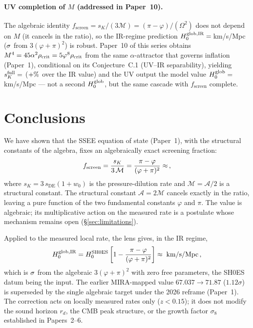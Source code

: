 \documentclass[12pt,a4paper]{article}
\newcommand{\phiG}{\varphi}
\newcommand{\MIRA}{\mathcal{M}}
\newcommand{\AURA}{\mathcal{A}}
\newcommand{\fsc}{f_{\mathrm{screen}}}
\newcommand{\sK}{s_K}          %
\newcommand{\sDE}{s_{\mathrm{DE}}} %
\renewcommand{\Omega}{\varOmega}
\begin{document}
\paragraph{UV completion of $M$ (addressed in Paper~10).}
The algebraic identity $\fsc = \sK/(3\MIRA) = (\pi-\phiG)/(\Omega^2)$ does not
depend on $M$ (it cancels in the ratio), so the IR-regime prediction
$H_0^{\rm glob,IR} = \val{p9_sh0es_glob_IR}$\,km/s/Mpc ($\val{p9_sh0es_sig_IR}\sigma$ from $3(\phiG+\pi)^2$) is robust.
Paper~10 of this series \citep{Paper10} obtains $M^4 = 45\alpha^2\rho_{\rm crit} = 5\phiG^8\rho_{\rm crit}$
from the same $\alpha$-attractor that governs inflation (Paper~1), conditional on its
Conjecture~C.1 (UV--IR separability), yielding
$\sK^{\rm full} = \val{S_K_FULL_d5}$ ($+\val{sK_UV_pct}\%$ over the IR value) and the UV output
the model value $H_0^{\rm glob} = \val{H0_GLOBAL_d5}$\,km/s/Mpc --- not a second
$H_0^{\rm glob}$, but the same cascade with $\fsc$ complete.

\section{Conclusions}
\label{sec:conclusions}

We have shown that the SSEE equation of state (Paper~1), with the structural
constants of the algebra, fixes an algebraically exact screening fraction:
\begin{equation}
  \fsc = \frac{\sK}{3\,\MIRA} = \frac{\pi-\phiG}{(\phiG+\pi)^2} \approx \val{F_SCREEN_IR_d5}\,,
\end{equation}
where $\sK = 3\,\sDE(1+w_0)$ is the pressure-dilution rate and
$\MIRA = \AURA/2$ is a structural constant.
The structural constant $\AURA = 2\MIRA$ cancels exactly in the ratio,
leaving a pure function of the two fundamental constants $\phiG$ and $\pi$.
The value is algebraic; its multiplicative action on the measured rate is a
postulate whose mechanism remains open (§\ref{sec:limitations}).

Applied to the measured local rate, the lens gives, in the IR regime,
\begin{equation}
  H_0^{\rm glob,IR} = H_0^{\rm SH0ES}\left[1-\frac{\pi-\phiG}{(\phiG+\pi)^2}\right]
  \approx \val{p9_sh0es_glob_IR}\;\text{km/s/Mpc}\,,
\end{equation}
which is $\val{p9_sh0es_sig_IR}\sigma$ from the algebraic $3(\phiG+\pi)^2$ with zero free
parameters, the SH0ES datum \citep{Riess2022} being the input.
The earlier MIRA-mapped value $67.037\to71.87$ ($1.12\sigma$) is superseded by
the single algebraic target under the 2026 reframe (Paper~1).
The correction acts on locally measured rates only ($z < 0.15$); it does
not modify the sound horizon $r_d$, the CMB peak structure, or the growth
factor $\sigma_8$ established in Papers~2--6.
\end{document}
